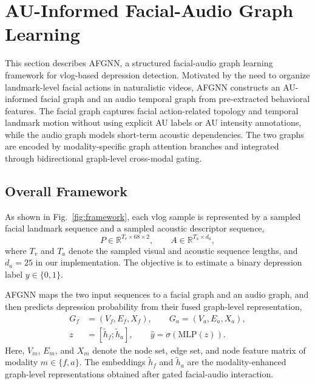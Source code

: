 \documentclass[conference]{IEEEtran}
\begin{document}
\section{AU-Informed Facial-Audio Graph Learning}
\label{sec:method}



This section describes AFGNN, a structured facial-audio graph learning framework for vlog-based depression detection. Motivated by the need to organize landmark-level facial actions in naturalistic videos, AFGNN constructs an AU-informed facial graph and an audio temporal graph from pre-extracted behavioral features. The facial graph captures facial action-related topology and temporal landmark motion without using explicit AU labels or AU intensity annotations, while the audio graph models short-term acoustic dependencies. The two graphs are encoded by modality-specific graph attention branches and integrated through bidirectional graph-level cross-modal gating.

\subsection{Overall Framework}

As shown in Fig.~\ref{fig:framework}, each vlog sample is represented by a sampled facial landmark sequence and a sampled acoustic descriptor sequence,
\begin{equation}
P\in\mathbb{R}^{T_v\times 68\times 2},\qquad
A\in\mathbb{R}^{T_a\times d_a},
\label{eqinput}
\end{equation}
where $T_v$ and $T_a$ denote the sampled visual and acoustic sequence lengths, and $d_a=25$ in our implementation. The objective is to estimate a binary depression label $y\in\{0,1\}$.

AFGNN maps the two input sequences to a facial graph and an audio graph, and then predicts depression probability from their fused graph-level representation,
\begin{equation}
\begin{aligned}
G_f&=(V_f,E_f,X_f),\qquad
G_a=(V_a,E_a,X_a),\\
z&=[\tilde{h}_f;\tilde{h}_a],\qquad
\hat{y}=\sigma(\mathrm{MLP}(z)).
\end{aligned}
\label{eqoverallmapping}
\end{equation}
Here, $V_m$, $E_m$, and $X_m$ denote the node set, edge set, and node feature matrix of modality $m\in\{f,a\}$. The embeddings $\tilde{h}_f$ and $\tilde{h}_a$ are the modality-enhanced graph-level representations obtained after gated facial-audio interaction.
\end{document}
